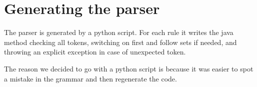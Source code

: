 \section{Generating the parser}

The parser is generated by a python script. For each rule it writes the java method checking all tokens, switching on first and follow sets if needed, and throwing an explicit exception in case of unexpected token.

The reason we decided to go with a python script is because it was easier to spot a mistake in the grammar and then regenerate the code.





